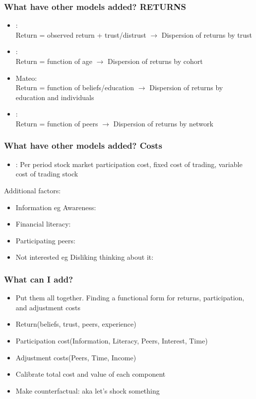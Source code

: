 \documentclass[pdflatex]{beamer}
\begin{document}
\begin{frame}
	\frametitle{What have other models added? RETURNS}
	\begin{itemize}
		\item \cite{GSZ2008_TrustingStockMarketb}:\\
		Return = observed return + trust/distrust $\rightarrow$ Dispersion of returns by trust
		\item \cite{MN2011_DepressionBabiesMacroeconomic}: \\
		Return = function of age $\rightarrow$ Dispersion of returns by cohort
		\item Mateo:\\
		 Return = function of beliefs/education $\rightarrow$ Dispersion of returns by education and individuals
		\item \cite{ACGH2022_InformativeSocialInteractionsa}: \\
		Return = function of peers $\rightarrow$ Dispersion of returns by network
	\end{itemize}
\end{frame}

\begin{frame}
	\frametitle{What have other models added? Costs}
	\begin{itemize}
		\item \cite{V2002_ExplanationHouseholdPortfolio}: Per period stock market participation cost, fixed cost of trading, variable cost of trading stock
	\end{itemize}
	Additional factors:
	\begin{itemize}
		\item Information eg Awareness: \cite{GJ2005_AwarenessStockMarket}
		\item Financial literacy: \cite{vLA2011_FinancialLiteracyStocka}
		\item Participating peers: \cite{BISW2008_NeighborsMatterCausal}
		\item Not interested eg Disliking thinking about it: \cite{SB2012_MeasuringFinancialAnxietyb}
	\end{itemize}

\end{frame}

\begin{frame}
	\frametitle{What can I add?}
	\begin{itemize}
		\item Put them all together. Finding a functional form for returns, participation, and adjustment costs
		\item Return(beliefs, trust, peers, experience)
		\item Participation cost(Information, Literacy, Peers, Interest, Time)
		\item Adjustment costs(Peers, Time, Income)
		\item Calibrate total cost and value of each component
		\item Make counterfactual: aka let's shock something
	\end{itemize}
\end{frame}
\end{document}

